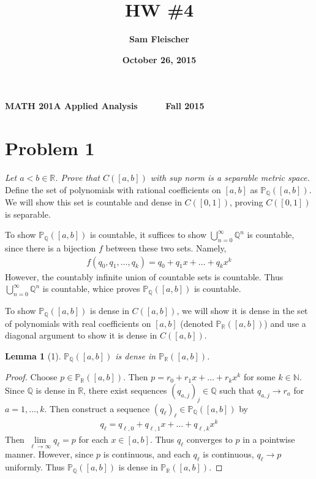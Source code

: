 \documentclass[12pt]{article}
\title{\bf HW \#4}
\author{\bf Sam Fleischer}
\date{\bf October 26, 2015}
\theoremstyle{plain}
\newtheorem*{lemma*}{Lemma}
\begin{document}
{\bf MATH 201A \hfill Applied Analysis \ \ \ \ \ \hfill Fall 2015} 

{\let\newpage\relax\maketitle}

\section*{Problem 1}
\emph{Let $a < b \in \mathbb{R}$.  Prove that $C([a,b])$ with sup norm is a separable metric space.} \\

Define the set of polynomials with rational coefficients on $[a,b]$ as $\mathbb{P}_{\mathbb{Q}}([a,b])$.  We will show this set is countable and dense in $C([0,1])$, proving $C([0,1])$ is separable.

To show $\mathbb{P}_{\mathbb{Q}}([a,b])$ is countable, it suffices to show $\bigcup\limits_{n=0}^\infty \mathbb{Q}^n$ is countable, since there is a bijection $f$ between these two sets.  Namely,
\begin{align*}
    f(q_0, q_1, \dots, q_k) = q_0 + q_1 x + \dots + q_k x^k
\end{align*}
However, the countably infinite union of countable sets is countable.  Thus $\bigcup\limits_{n=0}^\infty \mathbb{Q}^n$ is countable, whice proves $\mathbb{P}_{\mathbb{Q}}([a,b])$ is countable.

To show $\mathbb{P}_{\mathbb{Q}}([a,b])$ is dense in $C([a,b])$, we will show it is dense in the set of polynomials with real coefficients on $[a,b]$ (denoted $\mathbb{P}_{\mathbb{R}}([a,b])$) and use a diagonal argument to show it is dense in $C([a,b])$.
\begin{lemma*}[1]
    $\mathbb{P}_{\mathbb{Q}}([a,b])$ is dense in $\mathbb{P}_{\mathbb{R}}([a,b])$.
\end{lemma*}
\begin{proof}
    Choose $p \in \mathbb{P}_{\mathbb{R}}([a,b])$.  Then $p = r_0 + r_1 x + \dots + r_k x^k$ for some $k \in \mathbb{N}$.  Since $\mathbb{Q}$ is dense in $\mathbb{R}$, there exist sequences $(q_{a,j})_j \in \mathbb{Q}$ such that $q_{a,j} \rightarrow r_a$ for $a = 1, \dots, k$.  Then construct a sequence $(q_{\ell})_\ell \in \mathbb{P}_{\mathbb{Q}}([a,b])$ by
    \begin{align*}
        q_{\ell} = q_{\ell,0} + q_{\ell,1}x + \dots + q_{\ell,k}x^k
    \end{align*}
    Then $\lim\limits_{\ell\rightarrow\infty}q_{\ell} = p$ for each $x \in [a,b]$.  Thus $q_{\ell}$ converges to $p$ in a pointwise manner.  However, since $p$ is continuous, and each $q_{\ell}$ is continuous, $q_{\ell} \rightarrow p$ uniformly.  Thus $\mathbb{P}_{\mathbb{Q}}([a,b])$ is dense in $\mathbb{P}_{\mathbb{R}}([a,b])$.
\end{proof}
\end{document}
